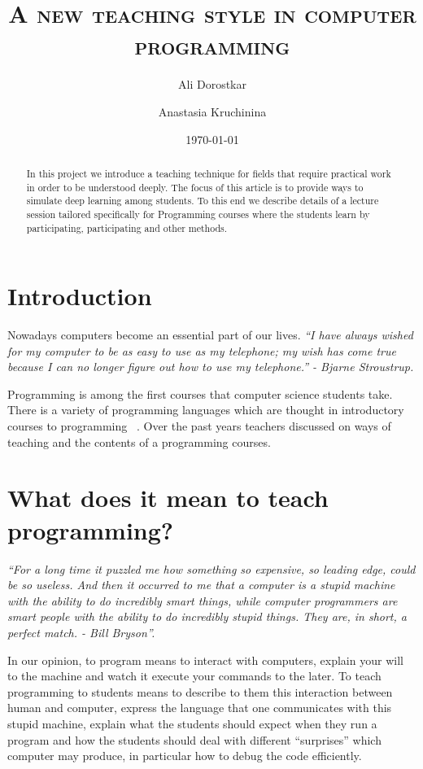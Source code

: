 \documentclass{article}
\author{Ali Dorostkar \and Anastasia Kruchinina}
\title{\textsc{A new teaching style in computer programming}}
\date{\today}
\begin{document}
\maketitle \begin{abstract}
In this project we introduce a teaching technique for fields that require
practical work in order to be understood deeply. The focus of this article is 
to provide ways to simulate deep learning among students. To this end we describe 
details of a lecture session tailored specifically for Programming courses
where the students learn by participating, participating and other methods.
\end{abstract}

\section{Introduction} %
\label{sec:introduction}

Nowadays computers become an essential part of our lives.  \emph{``I have always wished
for my computer to be as easy to use as my telephone; my wish has come true
because I can no longer figure out how to use my telephone.'' - Bjarne
Stroustrup.}  

Programming is among the first courses that computer science students take.
There is a variety of programming languages which are thought in introductory
courses to programming ~\cite{de2002language}. Over the past years teachers
discussed on ways of teaching and the contents of a programming courses.

\section{What does it mean to teach programming?}


\emph{``For a long time it puzzled me how something so expensive, so leading edge,
could be so useless. And then it occurred to me that a computer is a stupid
machine with the ability to do incredibly smart things, while computer
programmers are smart people with the ability to do incredibly stupid things.
They are, in short, a perfect match. - Bill Bryson''.}

In our opinion, to program means to interact with computers, explain your will
to the machine and watch it execute your commands to the later. To teach
programming to students means to describe to them this interaction between human
and computer, express the language that one communicates with this stupid
machine, explain what the students should expect when they run a program and how
the students should deal with different ``surprises'' which computer may
produce, in particular how to debug the code efficiently.
\end{document}
